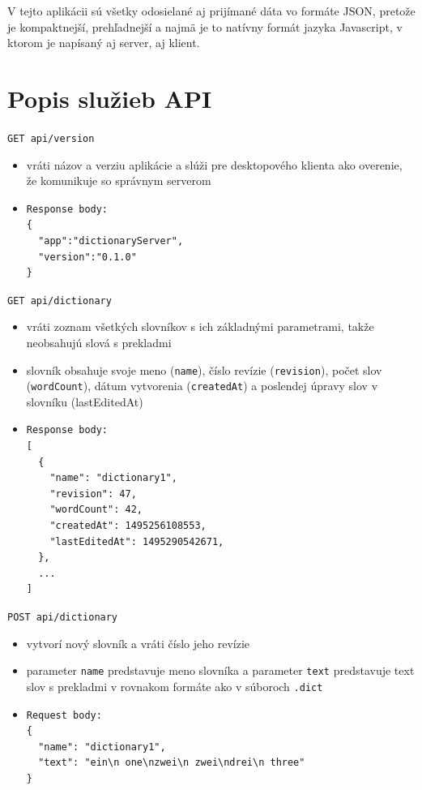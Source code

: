 \documentclass[
  digital, %
  table,   %
  lof,     %
  lot,     %
]{fithesis3}
\begin{document}
V tejto aplikácii sú všetky odosielané aj prijímané dáta vo formáte JSON, pretože je kompaktnejší, prehľadnejší a najmä je to natívny formát jazyka Javascript, v ktorom je napísaný aj server, aj klient.


\section{Popis služieb API} \label{sec:api}

\texttt{GET api/version}
\begin{itemize}
\item vráti názov a verziu aplikácie a slúži pre desktopového klienta ako overenie, že komunikuje so správnym serverom
\item \begin{lstlisting}[basicstyle=\small]
Response body:
{
  "app":"dictionaryServer",
  "version":"0.1.0"
}
\end{lstlisting}
\end{itemize}

\noindent
\texttt{GET api/dictionary}
\begin{itemize}
\item vráti zoznam všetkých slovníkov s ich základnými parametrami, takže neobsahujú slová s prekladmi
\item slovník obsahuje svoje meno (\texttt{name}), číslo revízie (\texttt{revision}), počet slov (\texttt{wordCount}), dátum vytvorenia (\texttt{createdAt}) a poslendej úpravy slov v slovníku (lastEditedAt)
\item \begin{lstlisting}[basicstyle=\small]
Response body:
[
  {
  	"name": "dictionary1",
  	"revision": 47,
    "wordCount": 42,
    "createdAt": 1495256108553,
    "lastEditedAt": 1495290542671,
  },
  ...
]
\end{lstlisting}
\end{itemize}

\noindent
\texttt{POST api/dictionary}
\begin{itemize}
\item vytvorí nový slovník a vráti číslo jeho revízie
\item parameter \texttt{name} predstavuje meno slovníka a parameter \texttt{text} predstavuje text slov s prekladmi v rovnakom formáte ako v súboroch \texttt{.dict}
\item \begin{lstlisting}[basicstyle=\small]
Request body:
{
  "name": "dictionary1",
  "text": "ein\n one\nzwei\n zwei\ndrei\n three"
}
\end{lstlisting}
\end{itemize}
\end{document}

